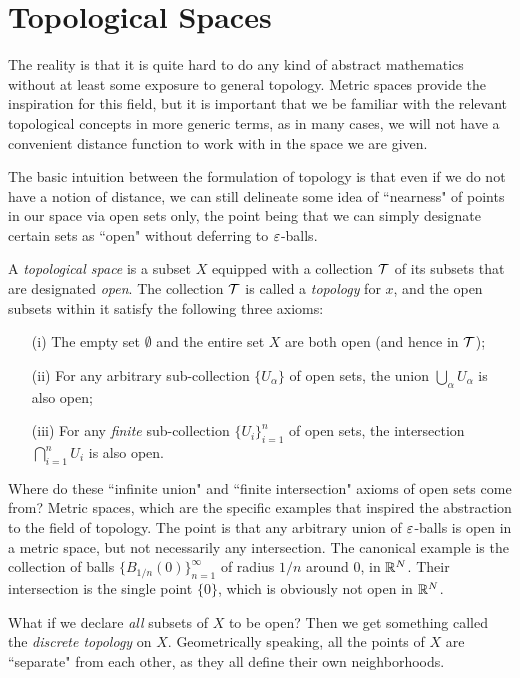 \section{Topological Spaces}
The reality is that it is quite hard to do any kind of abstract mathematics without at least some exposure to general topology. Metric spaces provide the inspiration for this field, but it is important that we be familiar with the relevant topological concepts in more generic terms, as in many cases, we will not have a convenient distance function to work with in the space we are given.

The basic intuition between the formulation of topology is that even if we do not have a notion of distance, we can still delineate some idea of ``nearness" of points in our space via open sets only, the point being that we can simply designate certain sets as ``open" without deferring to $\varepsilon$-balls.

\begin{definition}
	A \emph{topological space} is a subset $X$ equipped with a collection $\mathcal{T}$ of its subsets that are designated \emph{open}. The collection $\mathcal{T}$ is called a \emph{topology} for $x$, and the open subsets within it satisfy the following three axioms:
	\begin{enumerate}
		\item[(i)] The empty set $\emptyset$ and the entire set $X$ are both open (and hence in $\mathcal{T}$);
		\item[(ii)] For any arbitrary sub-collection $\{U_{\alpha}\}$ of open sets, the union $\bigcup_{\alpha} U_{\alpha}$ is also open;
		\item[(iii)] For any \emph{finite} sub-collection $\{U_i\}_{i=1}^{n}$ of open sets, the intersection $\bigcap_{i=1}^{n} U_i$ is also open.
	\end{enumerate}
\end{definition}

Where do these ``infinite union" and ``finite intersection" axioms of open sets come from? Metric spaces, which are the specific examples that inspired the abstraction to the field of topology. The point is that any arbitrary union of $\varepsilon$-balls is open in a metric space, but not necessarily any intersection. The canonical example is the collection of balls $\{B_{1/n}(0)\}_{n=1}^{\infty}$ of radius $1/n$ around $0$, in $\mathbb R^N$. Their intersection is the single point $\{0\}$, which is obviously not open in $\mathbb R^N$.

What if we declare \textit{all} subsets of $X$ to be open? Then we get something called the \emph{discrete topology} on $X$. Geometrically speaking, all the points of $X$ are ``separate" from each other, as they all define their own neighborhoods.


